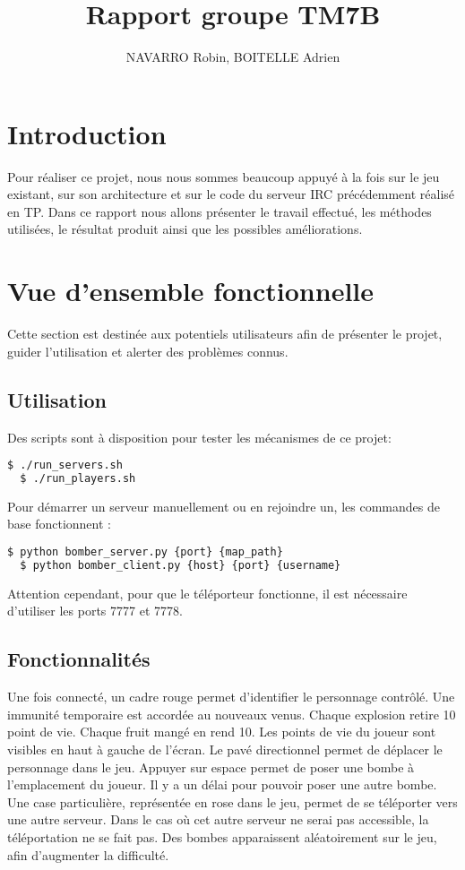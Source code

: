\documentclass[12pt]{article}
\title{Rapport groupe TM7B}
\author{NAVARRO Robin, BOITELLE Adrien}
\begin{document}
\maketitle

\newpage
\tableofcontents
\newpage

\section{Introduction}
Pour réaliser ce projet, nous nous sommes beaucoup appuyé à la fois sur le jeu existant, sur son architecture et sur le code du serveur IRC précédemment réalisé en TP. Dans ce rapport nous allons présenter le travail effectué, les méthodes utilisées, le résultat produit ainsi que les possibles améliorations.

\section{Vue d'ensemble fonctionnelle}

Cette section est destinée aux potentiels utilisateurs afin de présenter le projet, guider l'utilisation et alerter des problèmes connus.

\subsection{Utilisation}

Des scripts sont à disposition pour tester les mécanismes de ce projet:
\begin{lstlisting}[language=bash]
  $ ./run_servers.sh
  $ ./run_players.sh
\end{lstlisting}

Pour démarrer un serveur manuellement ou en rejoindre un, les commandes de base fonctionnent : 
\begin{lstlisting}[language=bash]
  $ python bomber_server.py {port} {map_path}
  $ python bomber_client.py {host} {port} {username}
\end{lstlisting}

Attention cependant, pour que le téléporteur fonctionne, il est nécessaire d'utiliser les ports 7777 et 7778.
\subsection{Fonctionnalités}
Une fois connecté, un cadre rouge permet d'identifier le personnage contrôlé. Une immunité temporaire est accordée au nouveaux venus. Chaque explosion retire 10 point de vie. Chaque fruit mangé en rend 10. Les points de vie du joueur sont visibles en haut à gauche de l'écran. Le pavé directionnel permet de déplacer le personnage dans le jeu. Appuyer sur espace permet de poser une bombe à l'emplacement du joueur. Il y a un délai pour pouvoir poser une autre bombe.
Une case particulière, représentée en rose dans le jeu, permet de se téléporter vers une autre serveur.
Dans le cas où cet autre serveur ne serai pas accessible, la téléportation ne se fait pas.
Des bombes apparaissent aléatoirement sur le jeu, afin d'augmenter la difficulté.
\end{document}
